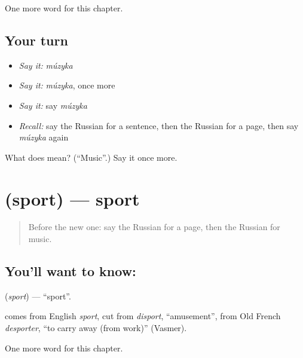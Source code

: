 \begin{grammarlens}[title={What you've built}]
One more word for this chapter.
\end{grammarlens}

\subsection*{Your turn}
\begin{itemize}
\raggedright
  \item \emph{Say it:} \emph{múzyka}
  \item \emph{Say it:} \emph{múzyka}, once more
  \item \emph{Say it:} say \emph{múzyka}
  \item \emph{Recall:} say the Russian for a sentence, then the Russian for a page, then say \emph{múzyka} again
\end{itemize}

\begin{tcolorbox}[breakable,colback=teal!4,colframe=teal!35!black,title={Before you move on}]
What does  mean? (\textquotedblleft{}Music\textquotedblright{}.) Say it once more.
\end{tcolorbox}
\section[\texorpdfstring{\ru{спорт} (sport)}{спорт (sport)}]{ (sport) — sport}

\label{lesson:RU-C112-sport}



\begin{quote}
Before the new one: say the Russian for a page, then the Russian for music.
\end{quote}

\subsection*{You'll want to know: }
\textbf{} (\emph{sport}) — \textquotedblleft{}sport\textquotedblright{}.

\begin{cousinweb}
\textbf{} comes from English \emph{sport}, cut from \emph{disport}, \textquotedblleft{}amusement\textquotedblright{}, from Old French \emph{desporter}, \textquotedblleft{}to carry away (from work)\textquotedblright{} (Vasmer).
\end{cousinweb}

\begin{grammarlens}[title={What you've built}]
One more word for this chapter.
\end{grammarlens}

